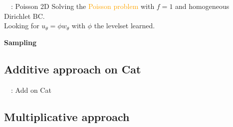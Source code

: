 \begin{frame}{\appendixname~\theappendixframenumber~: Poisson 2D}
	 Solving the \textcolor{orange}{Poisson problem} with $f=1$ and homogeneous Dirichlet BC. \\
	 Looking for $u_\theta = \phi w_\theta$ with $\phi$ the levelset learned. 
	
	\begin{center}
		\begin{minipage}{0.32\linewidth}
			\textbf{Sampling}
			
			\vspace{-8pt}
			\centering
		\end{minipage} \qquad 
		\begin{minipage}{0.32\linewidth}
			\centering
		\end{minipage} 
	\end{center}
	
	\begin{center}
	\end{center}
\end{frame}
\addtocounter{appendixframenumber}{1}

\subsection{Additive approach on Cat}

\begin{frame}{\appendixname~\theappendixframenumber~: Add on Cat}
	\begin{center}
	\end{center}
\end{frame}
\addtocounter{appendixframenumber}{1}

\subsection{Multiplicative approach}

